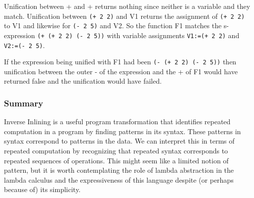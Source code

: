 \documentclass[a4paper,10pt]{article}
\begin{document}
Unification between + and + returns nothing since neither is a variable and they match.  Unification between \texttt{(+ 2 2)} and V1 returns the assignment of \texttt{(+ 2 2)} to V1 and likewise for \texttt{(- 2 5)} and V2.  So the function F1 matches the s-expression \texttt{(+ (+ 2 2) (- 2 5))} with variable assignments \texttt{V1:=(+ 2 2)} and \texttt{V2:=(- 2 5)}.

If the expression being unified with F1 had been \texttt{(- (+ 2 2) (- 2 5))} then unification between the outer - of the expression and the + of F1 would have returned false and the unification would have failed.

\subsubsection{Summary}
Inverse Inlining is a useful program transformation that identifies repeated computation in a program by finding patterns in its syntax.  These patterns in syntax correspond to patterns in the data.  We can interpret this in terms of repeated computation by recognizing that repeated syntax corresponds to repeated sequences of operations.  This might seem like a limited notion of pattern, but it is worth contemplating the role of lambda abstraction in the lambda calculus and the expressiveness of this language despite (or perhaps because of) its simplicity.
\end{document}

